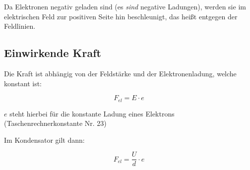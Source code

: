 




%
%	






Da Elektronen negativ geladen sind (es \emph{sind} negative Ladungen), werden sie im elektrischen Feld zur positiven Seite hin beschleunigt, das heißt entgegen der Feldlinien. 

\subsection{Einwirkende Kraft}

Die Kraft ist abhängig von der Feldstärke und der Elektronenladung, welche konstant ist:

\begin{equation}
	F_{el} = E \cdot e
\end{equation}

$e$ steht hierbei für die konstante Ladung eines Elektrons (Taschenrechnerkonstante Nr. 23)

Im Kondensator gilt dann:

\begin{equation} \label{eq:F_el}
	F_{el} = \frac{U}{d} \cdot e
\end{equation}
